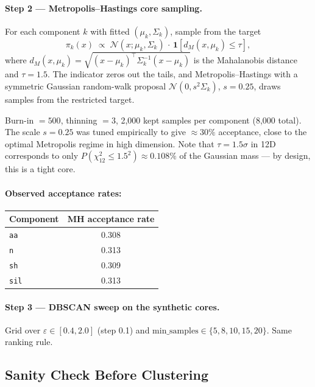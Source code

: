\documentclass[11pt]{article}
\begin{document}
\paragraph{Step 2 --- Metropolis--Hastings core sampling.} For each component $k$ with fitted $(\mu_k, \Sigma_k)$, sample from the target
\[
\pi_k(x) \;\propto\; \mathcal{N}(x;\mu_k,\Sigma_k) \,\cdot\, \mathbf{1}\!\left[d_M(x,\mu_k)\le\tau\right],
\]
where $d_M(x,\mu_k) = \sqrt{(x-\mu_k)^\top \Sigma_k^{-1} (x-\mu_k)}$ is the Mahalanobis distance and $\tau = 1.5$. The indicator zeros out the tails, and Metropolis--Hastings with a symmetric Gaussian random-walk proposal $\mathcal{N}(0, s^2 \Sigma_k)$, $s = 0.25$, draws samples from the restricted target.

Burn-in $= 500$, thinning $= 3$, 2{,}000 kept samples per component (8{,}000 total). The scale $s = 0.25$ was tuned empirically to give $\approx 30\%$ acceptance, close to the optimal Metropolis regime in high dimension. Note that $\tau = 1.5\sigma$ in 12D corresponds to only $P(\chi^2_{12} \le 1.5^2) \approx 0.108\%$ of the Gaussian mass --- by design, this is a tight core.

\paragraph{Observed acceptance rates:}
\begin{center}
\begin{tabular}{lc}
\toprule
Component & MH acceptance rate \\
\midrule
\texttt{aa}  & 0.308 \\
\texttt{n}   & 0.313 \\
\texttt{sh}  & 0.309 \\
\texttt{sil} & 0.313 \\
\bottomrule
\end{tabular}
\end{center}

\paragraph{Step 3 --- DBSCAN sweep on the synthetic cores.} Grid over $\varepsilon \in [0.4, 2.0]$ (step 0.1) and $\text{min\_samples} \in \{5, 8, 10, 15, 20\}$. Same ranking rule.

\subsection*{Sanity Check Before Clustering}
\end{document}
